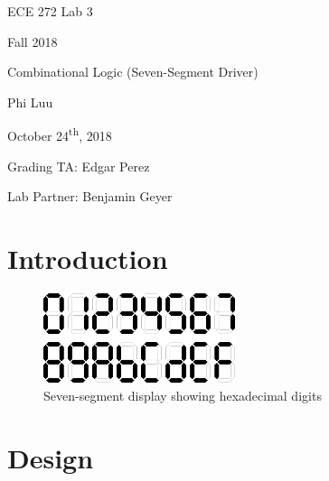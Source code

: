 \documentclass[12pt]{article}
\begin{document}
\begin{titlepage}
  \begin{center} \LARGE
    \vspace*{1.5in}

    ECE 272 Lab 3

    Fall 2018

    \vfill

    Combinational Logic (Seven-Segment Driver)

    Phi Luu

    \vfill

    October 24\textsuperscript{th}, 2018

    Grading TA: Edgar Perez

    Lab Partner: Benjamin Geyer

    \vspace{1.5in}
  \end{center}
\end{titlepage}

\section{Introduction}

\begin{figure}[h]
  \centering
  \includegraphics[width=0.5\textwidth]{seven_segment_hexadecimal.png}
  \caption{Seven-segment display showing hexadecimal digits \cite{EEStackExchangeSevenSegmentHex}}
  \label{figure:1}
\end{figure}

\section{Design}
\end{document}
